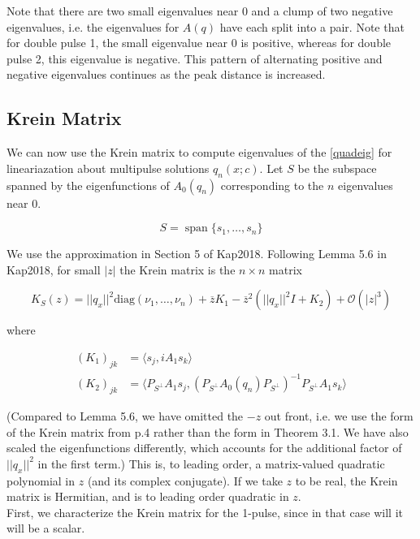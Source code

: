 \documentclass[12pt]{article}
\DeclareMathOperator{\spn}{span}
\begin{document}
Note that there are two small eigenvalues near 0 and a clump of two negative eigenvalues, i.e. the eigenvalues for $A(q)$ have each split into a pair. Note that for double pulse 1, the small eigenvalue near 0 is positive, whereas for double pulse 2, this eigenvalue is negative. This pattern of alternating positive and negative eigenvalues continues as the peak distance is increased.

\subsection{Krein Matrix}

We can now use the Krein matrix to compute eigenvalues of the \eqref{quadeig} for lineariazation about multipulse solutions $q_n(x; c)$. Let $S$ be the subspace spanned by the eigenfunctions of $A_0(q_n)$ corresponding to the $n$ eigenvalues near 0.

\begin{equation}\label{defS}
S = \spn\{s_1, \dots, s_n \}
\end{equation}

We use the approximation in Section 5 of Kap2018. Following Lemma 5.6 in Kap2018, for small $|z|$ the Krein matrix is the $n \times n$ matrix

\begin{equation}\label{Kreinform}
K_S(z) = ||q_x||^2 \text{diag}(\nu_1, \dots, \nu_n) + \overline{z} K_1 
- \overline{z}^2 ( ||q_x||^2 I + K_2) + \mathcal{O}(|z|^3)
\end{equation}

where

\begin{align}
(K_1)_{jk} &= \langle s_j, i A_1 s_k \rangle \\
(K_2)_{jk} &= \langle P_{S^\perp} A_1 s_j, (P_{S^\perp} A_0(q_n) P_{S^\perp})^{-1} P_{S^\perp} A_1 s_k \rangle
\end{align}

(Compared to Lemma 5.6, we have omitted the $-z$ out front, i.e. we use the form of the Krein matrix from p.4 rather than the form in Theorem 3.1. We have also scaled the eigenfunctions differently, which accounts for the additional factor of $||q_x||^2$ in the first term.) This is, to leading order, a matrix-valued quadratic polynomial in $z$ (and its complex conjugate). If we take $z$ to be real, the Krein matrix is Hermitian, and is to leading order quadratic in $z$.\\

First, we characterize the Krein matrix for the 1-pulse, since in that case will it will be a scalar.
\end{document}

